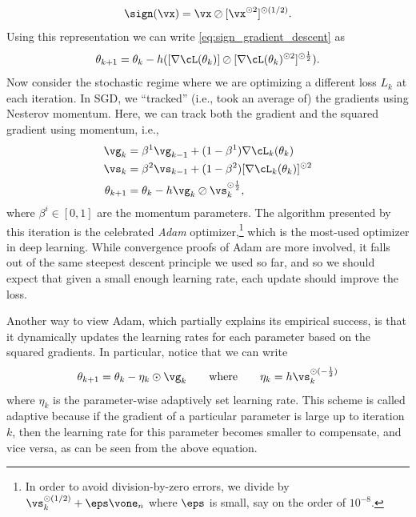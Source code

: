 \documentclass[../../book-main.tex]{subfiles}
\begin{document}
\begin{equation}
    \sign(\vx) = \vx \oslash [\vx^{\odot 2}]^{\odot (1/2)}.
\end{equation}
Using this representation we can write \eqref{eq:sign_gradient_descent} as 
\begin{equation}
    \theta_{k + 1} = \theta_{k} - h ([\nabla \cL(\theta_{k})] \oslash [\nabla \cL(\theta_{k})^{\odot 2}]^{\odot \frac{1}{2}}).
\end{equation}
Now consider the stochastic regime where we are optimizing a different loss \(L_{k}\) at each iteration. In SGD, we ``tracked'' (i.e., took an average of) the gradients using Nesterov momentum. Here, we can track both the gradient and the squared gradient using momentum, i.e.,
\begin{align}
    \vg_{k}
    &= \beta^{1}\vg_{k - 1} + (1 - \beta^{1})\nabla \cL_{k}(\theta_{k}) \\ 
    \vs_{k}
    &= \beta^{2}\vs_{k - 1} + (1 - \beta^{2})[\nabla \cL_{k}(\theta_{k})]^{\odot 2}  \\
    \theta_{k + 1}
    &= \theta_{k} - h\vg_{k}\oslash\vs_{k}^{\odot \frac{1}{2}},
\end{align}
where \(\beta^{i} \in [0, 1]\) are the momentum parameters. The algorithm presented by this iteration is the celebrated \textit{Adam} optimizer,\footnote{In order to avoid division-by-zero errors, we divide by \(\vs_{k}^{\odot (1/2)} + \eps \vone_{n}\) where \(\eps\) is small, say on the order of \(10^{-8}\).} which is the most-used optimizer in deep learning. While convergence proofs of Adam are more involved, it falls out of the same steepest descent principle we used so far, and so we should expect that given a small enough learning rate, each update should improve the loss.

Another way to view Adam, which partially explains its empirical success, is that it dynamically updates the learning rates for each parameter based on the squared gradients. In particular, notice that we can write
\begin{equation}
    \theta_{k + 1} = \theta_{k} - \eta_{k} \odot \vg_{k} \qquad \text{where} \qquad \eta_{k} = h \vs_{k}^{\odot (-\frac{1}{2})}
\end{equation}
where \(\eta_{k}\) is the parameter-wise adaptively set learning rate. This scheme is called adaptive because if the gradient of a particular parameter is large up to iteration \(k\), then the learning rate for this parameter becomes smaller to compensate, and vice versa, as can be seen from the above equation.
\end{document}
